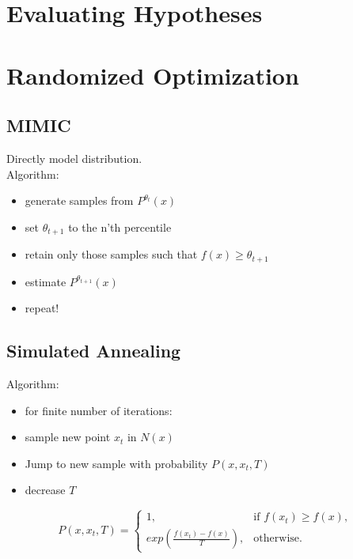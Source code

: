 \documentclass[11pt]{article}
\begin{document}
\section{Evaluating Hypotheses}

\section{Randomized Optimization}
\subsection{MIMIC}
Directly model distribution.\\
Algorithm:\\
\begin{itemize}
\item generate samples from $P^{\theta_t}(x)$
\item set $\theta_{t+1}$ to the n'th percentile
\item retain only those samples such that $f(x) \geq \theta_{t+1}$
\item estimate $P^{\theta_{t+1}}(x)$
\item repeat!
\end{itemize}

\subsection{Simulated Annealing}
Algorithm:\\
\begin{itemize}
\item for finite number of iterations:
\item sample new point $x_t$ in $N(x)$
\item Jump to new sample with probability $P(x, x_t, T)$
\item decrease $T$
\end{itemize}
$$P(x, x_t, T) =
    \begin{cases}
            1, &         \text{if } f(x_t) \geq f(x),\\
            exp(\frac{f(x_t)-f(x)}{T}), &         \text{otherwise}.
    \end{cases}
$$
\end{document}

